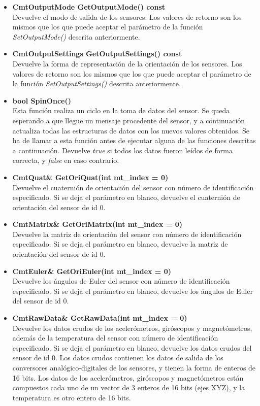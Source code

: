 \documentclass[12pt, a4paper]{report}
\begin{document}
\begin{itemize}
\begin{itemize}
		\item \textbf{CmtOutputMode GetOutputMode() const}\\
		Devuelve el modo de salida de los sensores. Los valores de retorno son los mismos que los que puede aceptar el parámetro de la función \textit{SetOutputMode()} descrita anteriormente.	
		
		\item \textbf{CmtOutputSettings GetOutputSettings() const}	\\
		Devuelve la forma de representación de la orientación de los sensores. Los valores de retorno son los mismos que los que puede aceptar el parámetro de la función \textit{SetOutputSettings()} descrita anteriormente.		
				
		\item \textbf{bool SpinOnce()}\\
		Esta función realiza un ciclo en la toma de datos del sensor. Se queda esperando a que llegue un mensaje procedente del sensor, y a continuación actualiza todas las estructuras de datos con los nuevos valores obtenidos. Se ha de llamar a esta función antes de ejecutar alguna de las funciones descritas a continuación. Devuelve \textit{true} si todos los datos fueron leídos de forma correcta, y \textit{false} en caso contrario.
		
		\item \textbf{CmtQuat\& GetOriQuat(int mt\_index = 0)}\\
		Devuelve el cuaternión de orientación del sensor con número de identificación especificado. Si se deja el parámetro en blanco, devuelve el cuaternión de orientación del sensor de id 0.
		
		\item \textbf{CmtMatrix\& GetOriMatrix(int mt\_index = 0)}\\
		Devuelve la matriz de orientación del sensor con número de identificación especificado. Si se deja el parámetro en blanco, devuelve la matriz de orientación del sensor de id 0.
		
		\item \textbf{CmtEuler\& GetOriEuler(int mt\_index = 0)}\\
		Devuelve los ángulos de Euler del sensor con número de identificación especificado. Si se deja el parámetro en blanco, devuelve los ángulos de Euler del sensor de id 0.
		
		\item \textbf{CmtRawData\& GetRawData(int mt\_index = 0)}\\
		Devuelve los datos crudos de los acelerómetros, giróscopos y magnetómetros, además de la temperatura del sensor con número de identificación especificado. Si se deja el parámetro en blanco, devuelve los datos crudos del sensor de id 0. Los datos crudos contienen los datos de salida de los conversores analógico-digitales de los sensores, y tienen la forma de enteros de 16 bits. Los datos de los acelerómetros, giróscopos y magnetómetros están compuestos cada uno de un vector de 3 enteros de 16 bits (ejes XYZ), y la temperatura es otro entero de 16 bits.	
		

\end{itemize}
\end{itemize}
\end{document}
